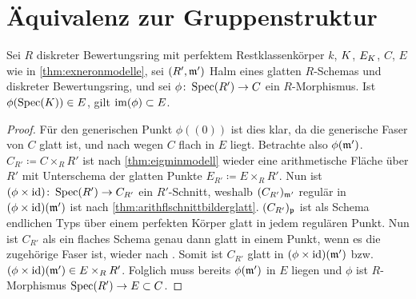 \documentclass[german]{scrreprt}
\begin{document}
\begin{Satz}
\end{Satz}

\section{Äquivalenz zur Gruppenstruktur}
\begin{Lemma}\label{thm:schnittearithmflglatt}
  Sei $R$ diskreter Bewertungsring mit perfektem Restklassenkörper
  $k$, $K$, $E_{K}$, $C$, $E$ wie in \ref{thm:exneronmodelle},
  sei $(R',\mathfrak{m}')$ Halm eines glatten $R$-Schemas und diskreter
  Bewertungsring,
  und sei $\phi\colon \operatorname{Spec}(R')\to C$ ein $R$-Morphismus.
  Ist $\phi(\operatorname{Spec}(K))\in E$, gilt $\operatorname{im}(\phi)\subset E$.
  \begin{proof}
    Für den generischen Punkt $\phi((0))$ ist dies klar, da die
    generische Faser von $C$ glatt ist, und nach
    \cite[8.5, Proposition 17]{bosch} wegen $C$ flach in $E$ liegt.
    Betrachte also $\phi(\mathfrak{m}')$.
    $C_{R'}\coloneqq C\times_R R'$ ist nach
    \ref{thm:eigminmodell} wieder eine arithmetische Fläche über
    $R'$ mit Unterschema der glatten Punkte
    $E_{R'}\coloneqq E\times_R R'$.
    Nun ist $(\phi\times\mathrm{id})\colon\operatorname{Spec}(R')\to C_{R'}$ ein
    $R'$-Schnitt, weshalb $(C_{R'})_{\mathfrak{m}'}$ regulär in
    $(\phi\times\mathrm{id})(\mathfrak{m}')$ ist nach
    \ref{thm:arithflschnittbilderglatt}.
    $(C_{R'})_{\mathfrak{p}}$ ist als Schema endlichen Typs über einem
    perfekten Körper glatt in jedem regulären Punkt.
    Nun ist $C_{R'}$ als ein flaches Schema genau dann glatt in
    einem Punkt, wenn es die zugehörige Faser ist, wieder nach
    \cite[8.5, Proposition 17]{bosch}.
    Somit ist $C_{R'}$ glatt in $(\phi\times\mathrm{id})(\mathfrak{m}')$ bzw.
    $(\phi\times\mathrm{id})(\mathfrak{m}')\in E\times_R R'$. Folglich muss bereits
    $\phi(\mathfrak{m}')$ in $E$ liegen und $\phi$ ist $R$-Morphismus
    $\operatorname{Spec}(R')\to E\subset C$.
  \end{proof}
\end{Lemma}  
\end{document}
